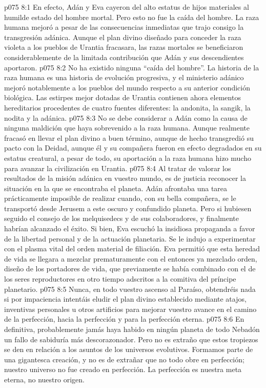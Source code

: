 \vs p075 8:1 En efecto, Adán y Eva cayeron del alto estatus de hijos materiales al humilde estado del hombre mortal. Pero esto no fue la caída del hombre. La raza humana mejoró a pesar de las consecuencias inmediatas que trajo consigo la transgresión adánica. Aunque el plan divino diseñado para conceder la raza violeta a los pueblos de Urantia fracasara, las razas mortales se beneficiaron considerablemente de la limitada contribución que Adán y sus descendientes aportaron.
\vs p075 8:2 No ha existido ninguna “caída del hombre”. La historia de la raza humana es una historia de evolución progresiva, y el ministerio adánico mejoró notablemente a los pueblos del mundo respecto a su anterior condición biológica. Las estirpes mejor dotadas de Urantia contienen ahora elementos hereditarios procedentes de cuatro fuentes diferentes: la andonita, la sangik, la nodita y la adánica.
\vs p075 8:3 No se debe considerar a Adán como la causa de ninguna maldición que haya sobrevenido a la raza humana. Aunque realmente fracasó en llevar el plan divino a buen término, aunque de hecho transgredió su pacto con la Deidad, aunque él y su compañera fueron en efecto degradados en su estatus creatural, a pesar de todo, su aportación a la raza humana hizo mucho para avanzar la civilización en Urantia.
\vs p075 8:4 \pc Al tratar de valorar los resultados de la misión adánica en vuestro mundo, es de justicia reconocer la situación en la que se encontraba el planeta. Adán afrontaba una tarea prácticamente imposible de realizar cuando, con su bella compañera, se le transportó desde Jerusem a este oscuro y confundido planeta. Pero si hubiesen seguido el consejo de los melquisedecs y de sus colaboradores, y  finalmente habrían alcanzado el éxito. Si bien, Eva escuchó la insidiosa propaganda a favor de la libertad personal y de la actuación planetaria. Se le indujo a experimentar con el plasma vital del orden material de filiación. Eva permitió que esta heredad de vida se llegara a mezclar prematuramente con el entonces ya mezclado orden, diseño de los portadores de vida, que previamente se había combinado con el de los seres reproductores en otro tiempo adscritos a la comitiva del príncipe planetario.
\vs p075 8:5 Nunca, en todo vuestro ascenso al Paraíso, obtendréis nada si por impaciencia intentáis eludir el plan divino establecido mediante atajos, inventivas personales u otros artificios para mejorar vuestro avance en el camino de la perfección, hacia la perfección y para la perfección eterna.
\vs p075 8:6 \pc En definitiva, probablemente jamás haya habido en ningún planeta de todo Nebadón un fallo de sabiduría más descorazonador. Pero no es extraño que estos tropiezos se den en relación a los asuntos de los universos evolutivos. Formamos parte de una gigantesca creación, y no es de extrañar que no todo obre en perfección; nuestro universo no fue creado en perfección. La perfección es nuestra meta eterna, no nuestro origen.
